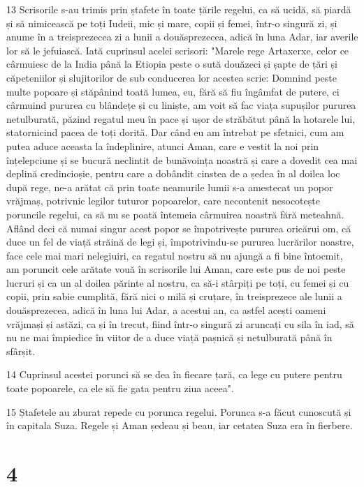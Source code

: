 \par 13 Scrisorile s-au trimis prin ștafete în toate țările regelui, ca să ucidă, să piardă și să nimicească pe toți Iudeii, mic și mare, copii și femei, într-o singură zi, și anume în a treisprezecea zi a lunii a douăsprezecea, adică în luna Adar, iar averile lor să le jefuiască. Iată cuprinsul acelei scrisori: "Marele rege Artaxerxe, celor ce cârmuiesc de la India până la Etiopia peste o sută douăzeci și șapte de țări și căpeteniilor și slujitorilor de sub conducerea lor acestea scrie: Domnind peste multe popoare și stăpânind toată lumea, eu, fără să fiu îngâmfat de putere, ci cârmuind pururea cu blândețe și cu liniște, am voit să fac viața supușilor pururea netulburată, păzind regatul meu în pace și ușor de străbătut până la hotarele lui, statornicind pacea de toți dorită. Dar când eu am întrebat pe sfetnici, cum am putea aduce aceasta la îndeplinire, atunci Aman, care e vestit la noi prin înțelepciune și se bucură neclintit de bunăvoința noastră și care a dovedit cea mai deplină credincioșie, pentru care a dobândit cinstea de a ședea în al doilea loc după rege, ne-a arătat că prin toate neamurile lumii s-a amestecat un popor vrăjmaș, potrivnic legilor tuturor popoarelor, care necontenit nesocotește poruncile regelui, ca să nu se poată întemeia cârmuirea noastră fără meteahnă. Aflând deci că numai singur acest popor se împotrivește pururea oricărui om, că duce un fel de viață străină de legi și, împotrivindu-se pururea lucrărilor noastre, face cele mai mari nelegiuiri, ca regatul nostru să nu ajungă a fi bine întocmit, am poruncit cele arătate vouă în scrisorile lui Aman, care este pus de noi peste lucruri și ca un al doilea părinte al nostru, ca să-i stârpiți pe toți, cu femei și cu copii, prin sabie cumplită, fără nici o milă și cruțare, în treisprezece ale lunii a douăsprezecea, adică în luna lui Adar, a acestui an, ca astfel acești oameni vrăjmași și astăzi, ca și în trecut, fiind într-o singură zi aruncați cu sila în iad, să nu ne mai împiedice în viitor de a duce viață pașnică și netulburată până în sfârșit.
\par 14 Cuprinsul acestei porunci să se dea în fiecare țară, ca lege cu putere pentru toate popoarele, ca ele să fie gata pentru ziua aceea".
\par 15 Ștafetele au zburat repede cu porunca regelui. Porunca s-a făcut cunoscută și în capitala Suza. Regele și Aman ședeau și beau, iar cetatea Suza era în fierbere.

\chapter{4}

